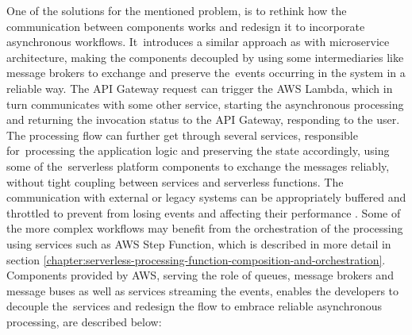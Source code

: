 One of the solutions for the mentioned problem, is to rethink how the communication between components works and redesign it to incorporate asynchronous workflows.
It~introduces a similar approach as with microservice architecture, making the components decoupled by using some intermediaries like message brokers to exchange and preserve the~events occurring in the system in a reliable way.
The API Gateway request can trigger the AWS Lambda, which in turn communicates with some other service, starting the asynchronous processing and returning the invocation status to the API Gateway, responding to the user.
The processing flow can further get through several services, responsible for~processing the application logic and preserving the state accordingly, using some of the~serverless platform components to exchange the messages reliably, without tight coupling between services and serverless functions.
The communication with external or legacy systems can be appropriately buffered and throttled to prevent from losing events and affecting their performance \cite{ServerlessAtScaleDesignPatternsAndOptimizations}.
Some of the more complex workflows may benefit from the orchestration of the processing using services such as AWS Step Function, which is described in more detail in section \ref{chapter:serverless-processing-function-composition-and-orchestration}. \\

Components provided by AWS, serving the role of queues, message brokers and message buses as well as services streaming the events, enables the developers to decouple the~services and redesign the flow to embrace reliable asynchronous processing, are described below:

